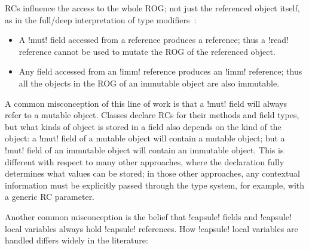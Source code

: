 RCs influence the access to the whole ROG; not just the referenced object itself, as in the full/deep interpretation of type modifiers~\cite{ZibinEtAl10,Potanin2013}:
\begin{itemize}

  \item 
A \Q!mut! field accessed from a \Q@read@ reference produces a \Q@read@ reference; thus a \Q!read! reference cannot be used to mutate the ROG of the referenced object.

  \item 
Any field accessed from an \Q!imm! reference produces an \Q!imm! reference; thus all the objects in the ROG of an immutable object are also immutable.
\end{itemize}
A common misconception of this line of work is that a \Q!mut! field will always refer to a mutable object.
Classes declare RCs for their methods and field types, but  what kinds of object is stored in a field also depends on the kind of the object: a \Q!mut! field of a mutable object will contain a mutable object; but a \Q!mut! field of an immutable object will contain an immutable object.
This is different with respect to many other approaches, where the
declaration fully determines what values can be stored; in those other approaches, any contextual information must be explicitly passed through the type system, for example, with a generic RC parameter.


Another common misconception is the belief that \Q!capsule! fields and \Q!capsule! local variables always hold \Q!capsule! references.
How \Q!capsule! local variables are handled differs widely in the literature:

